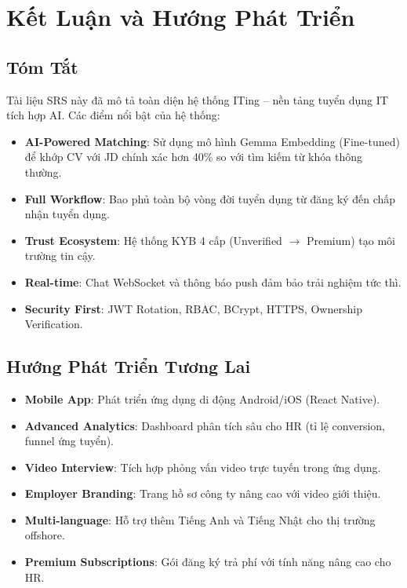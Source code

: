 \documentclass[12pt, a4paper]{report}
\begin{document}
\chapter{Kết Luận và Hướng Phát Triển}

\section{Tóm Tắt}

Tài liệu SRS này đã mô tả toàn diện hệ thống ITing -- nền tảng tuyển dụng IT tích hợp AI. Các điểm nổi bật của hệ thống:

\begin{itemize}
    \item \textbf{AI-Powered Matching}: Sử dụng mô hình Gemma Embedding (Fine-tuned) để khớp CV với JD chính xác hơn 40\% so với tìm kiếm từ khóa thông thường.
    \item \textbf{Full Workflow}: Bao phủ toàn bộ vòng đời tuyển dụng từ đăng ký đến chấp nhận tuyển dụng.
    \item \textbf{Trust Ecosystem}: Hệ thống KYB 4 cấp (Unverified $\rightarrow$ Premium) tạo môi trường tin cậy.
    \item \textbf{Real-time}: Chat WebSocket và thông báo push đảm bảo trải nghiệm tức thì.
    \item \textbf{Security First}: JWT Rotation, RBAC, BCrypt, HTTPS, Ownership Verification.
\end{itemize}

\section{Hướng Phát Triển Tương Lai}

\begin{itemize}
    \item \textbf{Mobile App}: Phát triển ứng dụng di động Android/iOS (React Native).
    \item \textbf{Advanced Analytics}: Dashboard phân tích sâu cho HR (tỉ lệ conversion, funnel ứng tuyển).
    \item \textbf{Video Interview}: Tích hợp phỏng vấn video trực tuyến trong ứng dụng.
    \item \textbf{Employer Branding}: Trang hồ sơ công ty nâng cao với video giới thiệu.
    \item \textbf{Multi-language}: Hỗ trợ thêm Tiếng Anh và Tiếng Nhật cho thị trường offshore.
    \item \textbf{Premium Subscriptions}: Gói đăng ký trả phí với tính năng nâng cao cho HR.
\end{itemize}
\end{document}
